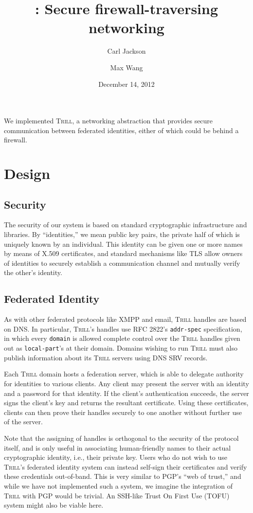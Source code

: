 \documentclass[11pt]{article}
\title{\Trill: Secure firewall-traversing networking}
\author{Carl Jackson \and Max Wang}
\date{December 14, 2012}
\newcommand{\Trill}{\textsc{Trill}\xspace}
\begin{document}
\maketitle

We implemented \Trill, a networking abstraction that provides secure
communication between federated identities, either of which could be behind a
firewall.

\section{Design}

\subsection{Security}

The security of our system is based on standard cryptographic infrastructure and
libraries. By ``identities,'' we mean public key pairs, the private half of
which is uniquely known by an individual. This identity can be given one or more
names by means of X.509 certificates, and standard mechanisms like TLS allow
owners of identities to securely establish a communication channel and mutually
verify the other's identity.

\subsection{Federated Identity}

As with other federated protocols like XMPP and email, \Trill handles are based
on DNS. In particular, \Trill's handles use RFC 2822's \verb`addr-spec`
specification, in which every \verb`domain` is allowed complete control over the
\Trill handles given out as \verb`local-part`'s at their domain. Domains wishing
to run \Trill must also publish information about its \Trill servers using DNS
SRV records.

Each \Trill domain hosts a federation server, which is able to delegate
authority for identities to various clients.  Any client may present the server
with an identity and a password for that identity.  If the client's
authentication succeeds, the server signs the client's key and returns the
resultant certificate.  Using these certificates, clients can then prove their
handles securely to one another without further use of the server.

Note that the assigning of handles is orthogonal to the security of the protocol
itself, and is only useful in associating human-friendly names to their actual
cryptographic identity, i.e., their private key. Users who do not wish to use
\Trill's federated identity system can instead self-sign their certificates and
verify these credentials out-of-band. This is very similar to PGP's ``web of
trust,'' and while we have not implemented such a system, we imagine the
integration of \Trill with PGP would be trivial. An SSH-like Trust On First Use
(TOFU) system might also be viable here.
\end{document}
